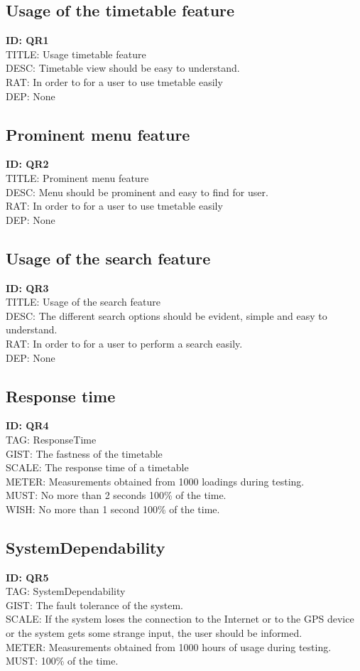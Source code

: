 \documentclass{scrreprt}
\begin{document}
\subsection{Usage of the timetable feature}
\textbf{ID: QR1}\\
TITLE: Usage timetable feature\\
DESC:  Timetable view should be easy to understand.\\
RAT: In order to for a user to use tmetable easily\\
DEP: None

\subsection{Prominent menu feature}
\textbf{ID: QR2}\\
TITLE: Prominent menu feature\\
DESC:  Menu should be prominent and easy to find for user.\\
RAT: In order to for a user to use tmetable easily\\
DEP: None

\subsection{Usage of the search feature}
\textbf{ID: QR3}\\
TITLE: Usage of the search feature\\
DESC:  The different search options should be evident, simple and easy to understand.\\
RAT: In order to for a user to perform a search easily.\\
DEP: None

\subsection{Response time}
\textbf{ID: QR4}\\
TAG: ResponseTime\\
GIST: The fastness of the timetable\\
SCALE: The response time of a timetable\\
METER: Measurements obtained from 1000 loadings during testing.\\
MUST: No more than 2 seconds 100\% of the time.\\
WISH: No more than 1 second 100\% of the time.

\subsection{SystemDependability}
\textbf{ID: QR5}\\
TAG: SystemDependability\\
GIST: The fault tolerance of the system.\\
SCALE: If the system loses the connection to the Internet or to the GPS device or the system gets some
strange input, the user should be informed.\\
METER: Measurements obtained from 1000 hours of usage during testing.\\
MUST: 100\% of the time.
\end{document}

